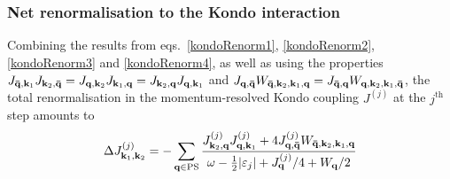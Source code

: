 \subsubsection*{Net renormalisation to the Kondo interaction}
Combining the results from eqs.~\ref{kondoRenorm1}, \ref{kondoRenorm2}, \ref{kondoRenorm3} and \ref{kondoRenorm4}, as well as using the properties \(J_{{\bf \bar q}, {\bf k}_1} J_{{\bf k}_2,{\bf \bar q}} = J_{{\bf q}, {\bf k}_2} J_{{\bf k}_1,{\bf q}} = J_{{\bf k}_2, {\bf q}} J_{{\bf q},{\bf k}_1}\) and \(J_{{\bf q}, {\bf \bar q}} W_{{\bf \bar q}, {\bf k}_2, {\bf k}_1, {\bf q}} = J_{{\bf \bar q}, {\bf q}} W_{{\bf q}, {\bf k}_2, {\bf k}_1, {\bf \bar q}}\), the total renormalisation in the momentum-resolved Kondo coupling \(J^{(j)}\) at the \(j^\text{th}\) step amounts to
\begin{equation}\begin{aligned}\label{rgeq2}
	\Delta J^{(j)}_{{\bf k}_1, {\bf k}_2} = -\sum_{{\bf q} \in \text{PS}} \frac{J^{(j)}_{{\bf k}_2,{\bf q}} J^{(j)}_{{\bf q},{\bf k}_1} + 4J^{(j)}_{{\bf q}, {\bf \bar q}} W_{{\bf \bar q}, {\bf k}_2, {\bf k}_1, {\bf q}}}{\omega - \frac{1}{2}|\varepsilon_j| + J^{(j)}_{{\bf q}}/4 + W_{{\bf q}}/2}
\end{aligned}\end{equation}


